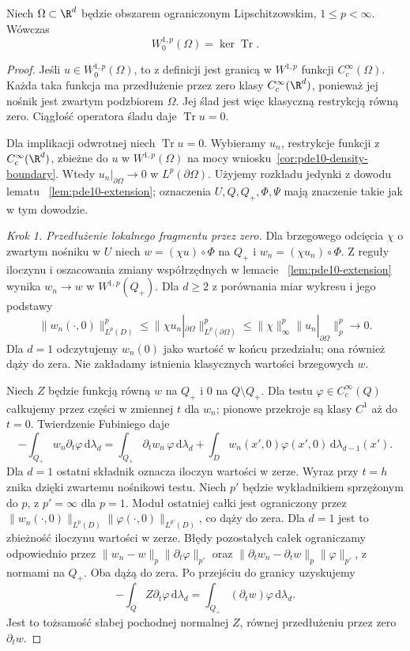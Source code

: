 \begin{twierdzenie}
\label{thm:pde10-trace-zero}
Niech $\Omega\subset\R^d$ będzie obszarem ograniczonym Lipschitzowskim, $1\le p<\infty$. Wówczas
\[
 W_0^{1,p}(\Omega)=\ker\operatorname{Tr}.
\]
\end{twierdzenie}
\begin{proof}
Jeśli $u\in W_0^{1,p}(\Omega)$, to z definicji jest
granicą w $W^{1,p}$ funkcji $C_c^\infty(\Omega)$.
Każda taka funkcja ma przedłużenie przez zero klasy
$C_c^\infty(\R^d)$, ponieważ jej nośnik jest zwartym
podzbiorem $\Omega$. Jej ślad jest więc klasyczną
restrykcją równą zero. Ciągłość operatora śladu daje
$\operatorname{Tr}u=0$.

Dla implikacji odwrotnej niech $\operatorname{Tr}u=0$.
Wybieramy $u_n$, restrykcje funkcji z $C_c^\infty(\R^d)$,
zbieżne do $u$ w $W^{1,p}(\Omega)$ na mocy
wniosku~\ref{cor:pde10-density-boundary}.
Wtedy $u_n|_{\partial\Omega}\to0$ w $L^p(\partial\Omega)$.
Użyjemy rozkładu jedynki z dowodu lematu
~\ref{lem:pde10-extension}; oznaczenia $U,Q,Q_+,\Phi,\Psi$
mają znaczenie takie jak w tym dowodzie.

\emph{Krok 1. Przedłużenie lokalnego fragmentu przez zero.}
Dla brzegowego odcięcia $\chi$ o zwartym nośniku w $U$
niech $w=(\chi u)\circ\Phi$ na $Q_+$ i
$w_n=(\chi u_n)\circ\Phi$. Z reguły iloczynu
i oszacowania zmiany współrzędnych w lemacie
~\ref{lem:pde10-extension} wynika $w_n\to w$ w $W^{1,p}(Q_+)$.
Dla $d\ge2$ z porównania miar wykresu i jego podstawy
\[
 \|w_n(\cdot,0)\|_{L^p(D)}^p
 \le\|\chi u_n|_{\partial\Omega}\|_{L^p(\partial\Omega)}^p
 \le\|\chi\|_\infty^p\|u_n|_{\partial\Omega}\|_p^p
 \longrightarrow0.
\]
Dla $d=1$ odczytujemy $w_n(0)$ jako wartość w końcu
przedziału; ona również dąży do zera.
Nie zakładamy istnienia klasycznych wartości brzegowych $w$.

Niech $Z$ będzie funkcją równą $w$ na $Q_+$ i $0$
na $Q\setminus Q_+$. Dla testu $\varphi\in C_c^\infty(Q)$
całkujemy przez części w zmiennej $t$ dla $w_n$;
pionowe przekroje są klasy $C^1$ aż do $t=0$.
Twierdzenie Fubiniego daje
\[
 -\int_{Q_+}w_n\partial_t\varphi\,\mathrm d\lambda_d
 =\int_{Q_+}\partial_tw_n\,\varphi\,\mathrm d\lambda_d
  +\int_D w_n(x',0)\varphi(x',0)\,\mathrm d\lambda_{d-1}(x').
\]
Dla $d=1$ ostatni składnik oznacza iloczyn wartości w zerze.
Wyraz przy $t=h$ znika dzięki zwartemu nośnikowi testu.
Niech $p'$ będzie wykładnikiem sprzężonym do $p$,
z $p'=\infty$ dla $p=1$. Moduł ostatniej całki
jest ograniczony przez
$\|w_n(\cdot,0)\|_{L^p(D)}\|\varphi(\cdot,0)\|_{L^{p'}(D)}$,
co dąży do zera. Dla $d=1$ jest to zbieżność
iloczynu wartości w zerze. Błędy pozostałych całek
ograniczamy odpowiednio przez
$\|w_n-w\|_p\|\partial_t\varphi\|_{p'}$ oraz
$\|\partial_tw_n-\partial_tw\|_p\|\varphi\|_{p'}$,
z normami na $Q_+$. Oba dążą do zera.
Po przejściu do granicy uzyskujemy
\[
 -\int_Q Z\partial_t\varphi\,\mathrm d\lambda_d
 =\int_{Q_+}(\partial_tw)\varphi\,\mathrm d\lambda_d.
\]
Jest to tożsamość słabej pochodnej normalnej $Z$,
równej przedłużeniu przez zero $\partial_tw$.


\end{proof}
